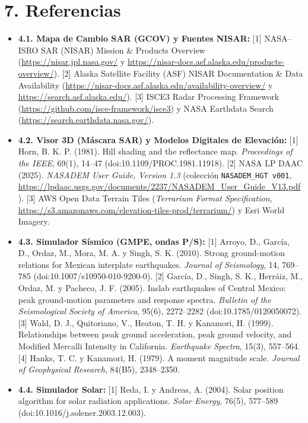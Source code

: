 \documentclass[10pt,a4paper]{article}
\begin{document}
\section*{7. Referencias}
\small
\begin{itemize}
\item \textbf{4.1. Mapa de Cambio SAR (GCOV) y Fuentes NISAR:}
[1] NASA–ISRO SAR (NISAR) Mission \& Products Overview (\url{https://nisar.jpl.nasa.gov/} y \url{https://nisar-docs.asf.alaska.edu/products-overview/}).
[2] Alaska Satellite Facility (ASF) NISAR Documentation \& Data Availability (\url{https://nisar-docs.asf.alaska.edu/availability-overview/} y \url{https://search.asf.alaska.edu/}).
[3] ISCE3 Radar Processing Framework (\url{https://github.com/isce-framework/isce3}) y NASA Earthdata Search (\url{https://search.earthdata.nasa.gov/}).
\item \textbf{4.2. Visor 3D (Máscara SAR) y Modelos Digitales de Elevación:}
[1] Horn, B. K. P. (1981). Hill shading and the reflectance map. \emph{Proceedings of the IEEE}, 69(1), 14–47 (doi:10.1109/PROC.1981.11918).
[2] NASA LP DAAC (2025). \emph{NASADEM User Guide, Version 1.3} (colección \texttt{NASADEM\_HGT v001}, \url{https://lpdaac.usgs.gov/documents/2237/NASADEM_User_Guide_V13.pdf}).
[3] AWS Open Data Terrain Tiles (\emph{Terrarium Format Specification}, \url{https://s3.amazonaws.com/elevation-tiles-prod/terrarium/}) y Esri World Imagery.
\item \textbf{4.3. Simulador Sísmico (GMPE, ondas P/S):}
[1] Arroyo, D., García, D., Ordaz, M., Mora, M. A. y Singh, S. K. (2010). Strong ground-motion relations for Mexican interplate earthquakes. \emph{Journal of Seismology}, 14, 769–785 (doi:10.1007/s10950-010-9200-0).
[2] García, D., Singh, S. K., Herráiz, M., Ordaz, M. y Pacheco, J. F. (2005). Inslab earthquakes of Central Mexico: peak ground-motion parameters and response spectra. \emph{Bulletin of the Seismological Society of America}, 95(6), 2272–2282 (doi:10.1785/0120050072).
[3] Wald, D. J., Quitoriano, V., Heaton, T. H. y Kanamori, H. (1999). Relationships between peak ground acceleration, peak ground velocity, and Modified Mercalli Intensity in California. \emph{Earthquake Spectra}, 15(3), 557–564.
[4] Hanks, T. C. y Kanamori, H. (1979). A moment magnitude scale. \emph{Journal of Geophysical Research}, 84(B5), 2348–2350.
\item \textbf{4.4. Simulador Solar:}
[1] Reda, I. y Andreas, A. (2004). Solar position algorithm for solar radiation applications. \emph{Solar Energy}, 76(5), 577–589 (doi:10.1016/j.solener.2003.12.003).

\end{itemize}
\end{document}
